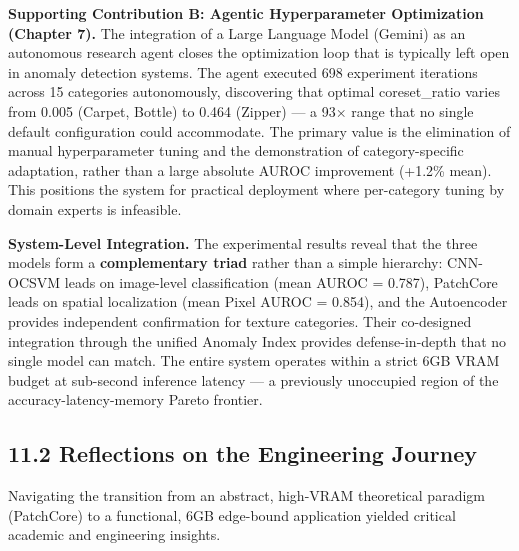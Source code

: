\textbf{Supporting Contribution B: Agentic Hyperparameter Optimization (Chapter 7).} The integration of a Large Language Model (Gemini) as an autonomous research agent closes the optimization loop that is typically left open in anomaly detection systems. The agent executed 698 experiment iterations across 15 categories autonomously, discovering that optimal coreset\_ratio varies from 0.005 (Carpet, Bottle) to 0.464 (Zipper) --- a 93× range that no single default configuration could accommodate. The primary value is the elimination of manual hyperparameter tuning and the demonstration of category-specific adaptation, rather than a large absolute AUROC improvement (+1.2\% mean). This positions the system for practical deployment where per-category tuning by domain experts is infeasible.

\textbf{System-Level Integration.} The experimental results reveal that the three models form a \textbf{complementary triad} rather than a simple hierarchy: CNN-OCSVM leads on image-level classification (mean AUROC = 0.787), PatchCore leads on spatial localization (mean Pixel AUROC = 0.854), and the Autoencoder provides independent confirmation for texture categories. Their co-designed integration through the unified Anomaly Index provides defense-in-depth that no single model can match. The entire system operates within a strict 6GB VRAM budget at sub-second inference latency --- a previously unoccupied region of the accuracy-latency-memory Pareto frontier.

\subsection{11.2 Reflections on the Engineering Journey}\label{reflections-on-the-engineering-journey}

Navigating the transition from an abstract, high-VRAM theoretical paradigm (PatchCore) to a functional, 6GB edge-bound application yielded critical academic and engineering insights.

